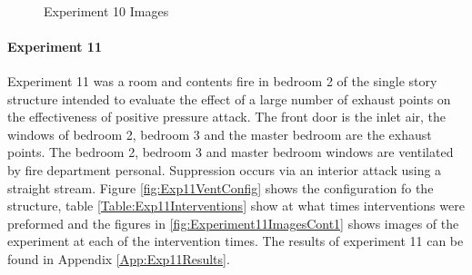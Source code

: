 \documentclass{article}
\begin{document}
\begin{figure}[H]
	\ContinuedFloat 
	\centering 
	 \ 
	 \ 
	\caption{Experiment 10 Images}
	\label{fig:Experiment10ImagesCont3} 
\end{figure}

\paragraph{Experiment 11}\mbox{}

Experiment 11 was a room and contents fire in bedroom 2 of the single story structure intended to evaluate the effect of a large number of exhaust points on the effectiveness of positive pressure attack. The front door is the inlet air, the windows of bedroom 2, bedroom 3 and the master bedroom are the exhaust points. The bedroom 2, bedroom 3 and master bedroom windows are ventilated by fire department personal. Suppression occurs via an interior attack using a straight stream. Figure \ref{fig:Exp11VentConfig} shows the configuration fo the structure, table \ref{Table:Exp11Interventions} show at what times interventions were preformed and the figures in \ref{fig:Experiment11ImagesCont1} shows images of the experiment at each of the intervention times. The results of experiment 11 can be found in Appendix \ref{App:Exp11Results}.
\end{document}
